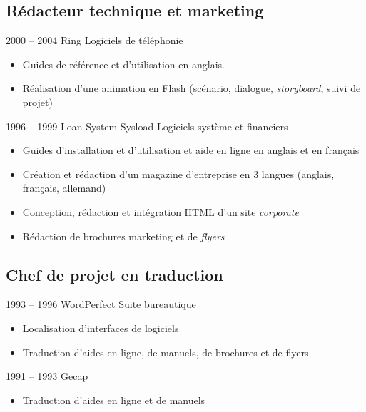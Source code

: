 \documentclass[12pt,a4paper,roman]{moderncv}
\begin{document}
\subsection{Rédacteur technique et marketing}

\cventry
    {2000 – 2004}
    {Ring}
    {Logiciels de téléphonie}
    {}
    {}
    {
      \begin{itemize}
      \item Guides de référence et d'utilisation en anglais.
      \item Réalisation d'une animation en Flash (scénario, dialogue,
        \textit{storyboard}, suivi de projet)
    \end{itemize}}


\cventry
    {1996 – 1999}
    {Loan System-Sysload}
    {Logiciels système et financiers}
    {}
    {}
    {
      \begin{itemize}
      \item Guides d'installation et d'utilisation et aide en ligne en anglais
        et en français
      \item Création et rédaction d'un magazine d'entreprise en 3 langues
        (anglais, français, allemand)
      \item Conception, rédaction et intégration HTML d'un site
        \textit{corporate}
      \item Rédaction de brochures marketing et de \textit{flyers}
      \end{itemize}
    }


\subsection{Chef de projet en traduction}

\cventry
    {1993 – 1996}
    {WordPerfect}
    {Suite bureautique}
    {}
    {}
    {
      \begin{itemize}
      \item Localisation d'interfaces de logiciels
      \item Traduction d'aides en ligne, de manuels, de brochures et de flyers
      \end{itemize}
    }


\cventry
    {1991 – 1993}
    {Gecap}
    {}
    {}
    {}
    {
      \begin{itemize}
      \item Traduction d'aides en ligne et de manuels
      \end{itemize}
    }
\end{document}
